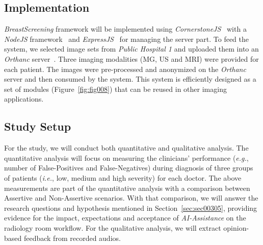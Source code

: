 \subsection{Implementation}
\label{sec:sec00402}

{\it BreastScreening} framework will be implemented using {\it CornerstoneJS}\footnotemark[3]~\cite{urban2017lesiontracker} with a {\it NodeJS} framework\footnotemark[4]~\cite{10.5555/3002437, drnasin2017javascript} and {\it ExpressJS}\footnotemark[5]~\cite{10.1117/12.2285952} for managing the server part.
To feed the system, we selected image sets from {\it Public Hospital 1} and uploaded them into an {\it Orthanc} server~\cite{Jodogne2018}.
Three imaging modalities (MG, US and MRI) were provided for each patient.
The images were pre-processed and anonymized on the {\it Orthanc} server and then consumed by the system.
This system is efficiently designed as a set of modules (Figure~\ref{fig:fig008}) that can be reused in other imaging applications.



\subsection{Study Setup}
\label{sec:sec00403}

For the study, we will conduct both quantitative and qualitative analysis.
The quantitative analysis will focus on measuring the clinicians' performance ({\it e.g.}, number of False-Positives and False-Negatives) during diagnosis of three groups of patients ({\it i.e.}, low, medium and high severity) for each doctor.
The above measurements are part of the quantitative analysis with a comparison between Assertive and Non-Assertive scenarios.
With that comparison, we will answer the  research questions and hypothesis mentioned in Section~\ref{sec:sec00305}, providing evidence for the impact, expectations and acceptance of {\it AI-Assistance} on the radiology room workflow.
For the qualitative analysis, we will extract opinion-based feedback from recorded audios.


